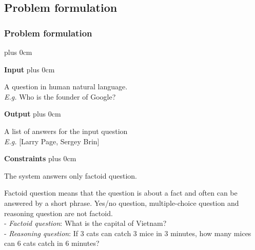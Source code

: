 \documentclass[11pt]{beamer}
\renewcommand{\raggedright}{\leftskip=0pt \rightskip=0pt plus 0cm}
\let\olditemize=\itemize
\renewenvironment{itemize}{\olditemize\raggedright}{\endlist}
\begin{document}
\subsection{Problem formulation}
\begin{frame}
\begin{adjustwidth}{-2em}{1em}
\frametitle{Problem formulation}
\begin{itemize}
	\item \textbf{Input} 
	\begin{itemize}
		\item A question in human natural language.\\[5pt]
		\textit{E.g.} Who is the founder of Google?
	\end{itemize}
	\item \textbf{Output}
	\begin{itemize}
		\item A list of answers for the input question \\[5pt]
		\textit{E.g.} [Larry Page, Sergey Brin]
	\end{itemize}
	\item \textbf{Constraints}
	\begin{itemize}
		\item The system answers only factoid question.
		\item Factoid question means that the question is about a fact and often can be answered by a short phrase. Yes/no question, multiple-choice question and reasoning question are not factoid. \\[5pt]
		- \textit{Factoid question}: What is the capital of Vietnam? \\
		- \textit{Reasoning question}: If 3 cats can catch 3 mice in 3 minutes, how many mices can 6 cats catch in 6 minutes?
	\end{itemize}
\end{itemize}
\end{adjustwidth}
\end{frame}
\end{document}
